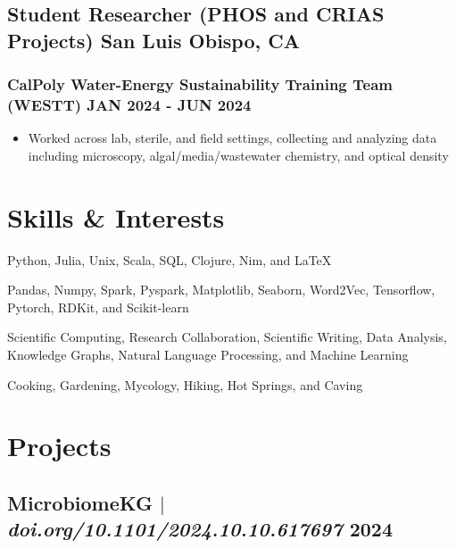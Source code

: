 \documentclass[11pt]{article} %
\begin{document}
\subsection{Student Researcher (PHOS and CRIAS Projects) \hfill San Luis Obispo, CA}
\subsubsection{\small CalPoly Water-Energy Sustainability Training Team (WESTT) \hfill JAN 2024 - JUN 2024}
\begin{itemize}
	\item Worked across lab, sterile, and field settings, collecting and analyzing data \\ including microscopy, algal/media/wastewater chemistry, and optical density
\end{itemize}

\section{Skills \& Interests}
\begin{description}[itemsep=0pt]
	\item[Languages] Python, Julia, Unix, Scala, SQL, Clojure, Nim, and LaTeX
	\item[Libraries] Pandas, Numpy, Spark, Pyspark, Matplotlib, Seaborn, Word2Vec, Tensorflow, \\ Pytorch, RDKit, and Scikit-learn
	\item[Skills] Scientific Computing, Research Collaboration, Scientific Writing, Data Analysis, \\ Knowledge Graphs, Natural Language Processing, and Machine Learning 
	\item[Interests] Cooking, Gardening, Mycology, Hiking, Hot Springs, and Caving
\end{description}

\section{Projects}
\subsection{MicrobiomeKG $|$ \normalfont\textit{doi.org/10.1101/2024.10.10.617697} \hfill 2024}
\end{document}
